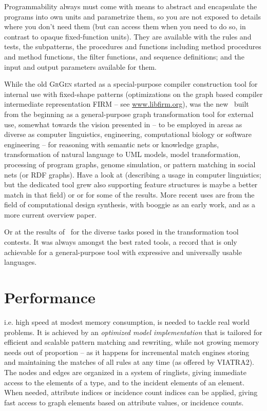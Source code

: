 Programmability always must come with means to abstract and encapsulate the programs into own units and parametrize them, so you are not exposed to details where you don't need them (but can access them when you need to do so, in contrast to opaque fixed-function units).
They are available with the rules and tests, the subpatterns, the procedures and functions including method procedures and method functions, the filter functions, and sequence definitions; and the input and output parameters available for them.

While the old \textsc{GrGen} started as a special-purpose compiler construction tool for internal use with fixed-shape patterns 
(optimizations on the graph based compiler intermediate representation FIRM -- see \url{www.libfirm.org}),
was the new \GrG\ built from the beginning as a general-purpose graph transformation tool for external use, somewhat towards the vision presented in \cite{blostein95practicalissues}
-- to be employed in areas as diverse as computer linguistics, engineering, computational biology or software engineering --
for reasoning with semantic nets or knowledge graphs, transformation of natural language to UML models,
model transformation, processing of program graphs, genome simulation, or pattern matching in social nets (or RDF graphs).
Have a look at \cite{usecomputerlinguistics} (describing a usage in computer linguistics; but the dedicated tool grew \cite{grew:book} also supporting feature structures is maybe a better match in that field) or \cite{usemodeltransformation} or \cite{usegeneexpression} for some of the results.
More recent uses are from the field of computational design synthesis, with booggie \cite{booggie} as an early work, and \cite{graph:engineering} as a more current overview paper.

Or at the results of \GrG\ for the diverse tasks posed in the transformation tool contests. 
It was always amongst the best rated tools, a record that is only achievable for a general-purpose tool with expressive and universally usable languages.

\section{Performance}
i.e. high speed at modest memory consumption, is needed to tackle real world problems.
It is achieved by an \emph{optimized model implementation} that is tailored for efficient and scalable pattern matching and rewriting,
while not growing memory needs out of proportion -- as it happens for incremental match engines storing and maintaining the matches of all rules at any time (as offered by VIATRA2\cite{viatra2}).
The nodes and edges are organized in a system of ringlists, giving immediate access to the elements of a type, and to the incident elements of an element.
When needed, attribute indices or incidence count indices can be applied, giving fast access to graph elements based on attribute values, or incidence counts.

